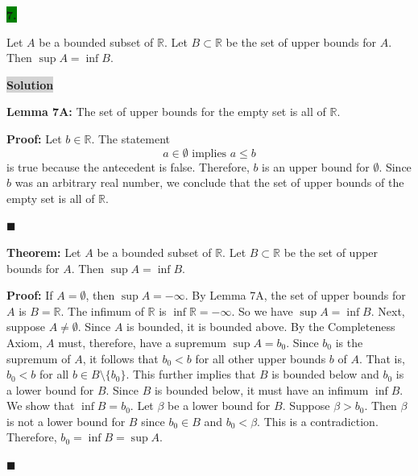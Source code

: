 \documentclass[12pt]{article}
\newcommand{\mybox}{%
    \collectbox{%
        \setlength{\fboxsep}{2pt}%
        \fbox{\BOXCONTENT}%
    }%
}
\begin{document}
\pagebreak

\noindent\mybox{\colorbox{green}{\textbf{7.}}}\hspace{3mm}\hrulefill

\noindent Let $A$ be a bounded subset of $\mathbb{R}$. Let $B\subset \mathbb{R}$ be the
set of upper bounds for $A$. Then $\sup A = \inf B$.

\vspace{5mm}

\noindent\mybox{\colorbox{lightgray}{\textbf{Solution}}} \hspace{3mm}\hrulefill

\noindent \textbf{Lemma 7A:} The set of upper bounds for the empty set is all of $\mathbb{R}$.

\noindent \textbf{Proof:} Let $b\in\mathbb{R}$. The statement $$a\in\emptyset \text{ implies } a\leq b$$ is true because the antecedent is false. Therefore, $b$ is an upper bound for $\emptyset$. Since $b$ was an arbitrary real number, we conclude that the set of upper bounds of the empty set is all of $\mathbb{R}$.

\hfill$\blacksquare$

\vspace{5mm}

\noindent \textbf{Theorem:} Let $A$ be a bounded subset of $\mathbb{R}$. Let $B\subset \mathbb{R}$ be the set of upper bounds for $A$. Then $\sup A = \inf B$.

\noindent \textbf{Proof:} If $A = \emptyset$, then $\sup A = -\infty$. By Lemma 7A, the set of upper bounds for $A$ is $B=\mathbb{R}$. The infimum of $\mathbb{R}$ is $\inf \mathbb{R} = -\infty$. So we have $\sup A = \inf B$. Next, suppose $A\neq \emptyset$. Since $A$ is bounded, it is bounded above. By the Completeness Axiom, $A$ must, therefore, have a supremum $\sup A = b_0$. Since $b_0$ is the supremum of $A$, it follows that $b_0<b$ for all other upper bounds $b$ of $A$. That is, $b_0<b$ for all $b\in B\setminus\lbrace b_0 \rbrace$. This further implies that $B$ is bounded below and $b_0$ is a lower bound for $B$. Since $B$ is bounded below, it must have an infimum $\inf B$. We show that $\inf B = b_0$. Let $\beta$ be a lower bound for $B$. Suppose $\beta>b_0$. Then $\beta$ is not a lower bound for $B$ since $b_0\in B$ and $b_0<\beta$. This is a contradiction. Therefore, $b_0 = \inf B = \sup A$.

\hfill$\blacksquare$
\end{document}

